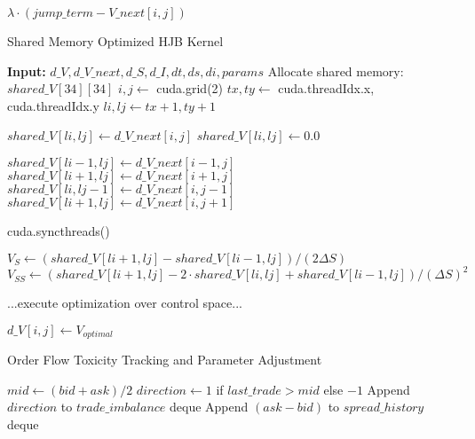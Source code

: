 \documentclass[twocolumn,11pt]{IEEEtran}  %
\begin{document}
\begin{onecolumn}
\begin{onecolumn}
\begin{algorithm}
\begin{algorithmic}[1]
    \State \Return $\lambda \cdot (jump\_term - V\_next[i,j])$ 
\EndFunction
\end{algorithmic}
\end{algorithm}


\begin{algorithm}
\caption{Shared Memory Optimized HJB Kernel}
\begin{algorithmic}[1]
\State \textbf{Input:} $d\_V, d\_V\_next, d\_S, d\_I, dt, ds, di, params$
\State Allocate shared memory: $shared\_V[34][34]$ 
\State $i, j \gets$ cuda.grid(2)
\State $tx, ty \gets$ cuda.threadIdx.x, cuda.threadIdx.y
\State $li, lj \gets tx + 1, ty + 1$ 

\State {}
    \State $shared\_V[li, lj] \gets d\_V\_next[i, j]$
\Else
    \State $shared\_V[li, lj] \gets 0.0$
\EndIf

\State {}
 
    \State $shared\_V[li-1, lj] \gets d\_V\_next[i-1, j]$
\EndIf
{} 
    \State $shared\_V[li+1, lj] \gets d\_V\_next[i+1, j]$
\EndIf
{} 
    \State $shared\_V[li, lj-1] \gets d\_V\_next[i, j-1]$
\EndIf
{} 
    \State $shared\_V[li+1, lj] \gets d\_V\_next[i, j+1]$
\EndIf

\State cuda.syncthreads() 

    \State {}
    \State $V_S \gets (shared\_V[li+1, lj] - shared\_V[li-1, lj])/(2\Delta S)$
    \State $V_{SS} \gets (shared\_V[li+1, lj] - 2 \cdot shared\_V[li, lj] + shared\_V[li-1, lj])/(\Delta S)^2$
    
    \State {}
    \State ...execute optimization over control space...
    
    \State $d\_V[i, j] \gets V_{optimal}$
\EndIf
\end{algorithmic}
\end{algorithm}


\begin{algorithm}
\caption{Order Flow Toxicity Tracking and Parameter Adjustment}
\begin{algorithmic}[1]
    \State $mid \gets (bid + ask)/2$
    \State $direction \gets 1$ if $last\_trade > mid$ else $-1$
    \State Append $direction$ to $trade\_imbalance$ deque
    \State Append $(ask - bid)$ to $spread\_history$ deque
\EndFunction


\end{algorithmic}
\end{algorithm}
\end{onecolumn}
\end{onecolumn}
\end{document}

